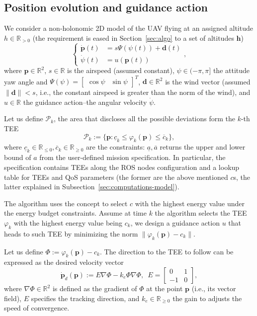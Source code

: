 \documentclass[letterpaper,10pt,conference]{ieeeconf}
\begin{document}
\subsection{Position evolution and guidance action}
\label{sec:position}

We consider a non-holonomic 2D model of the UAV flying at an assigned altitude $h\in\mathbb{R}_{>0}$ (the requirement is eased in Section~\ref{sec:algo} to a set of altitudes $\mathbf{h}$)
\begin{equation}\label{eq:uav-kinem}\begin{cases}
  \dot{\mathbf{p}}(t)&=s\Psi(\psi(t))+\mathbf{d}(t)\\
  \dot{\psi}(t)&=u(\mathbf{p}(t))
\end{cases},
\end{equation}
where $\mathbf{p}\in\mathbb{R}^2$, $s\in\mathbb{R}$ is the airspeed (assumed constant), $\psi\in(-\pi,\pi]$ the attitude yaw angle and $\Psi(\psi)=\begin{bmatrix}\cos{\psi} & \sin{\psi}\end{bmatrix}^T$, $\mathbf{d}\in\mathbb{R}^2$ is the wind vector (assumed $\|\mathbf{d}\|<s$, i.e., the constant airspeed is greater than the norm of the wind), and $u\in\mathbb{R}$ the guidance action--the angular velocity $\dot{\psi}$.

Let us define $\mathcal{P}_k$, the area that discloses all the possible deviations form the $k$-th TEE 
\begin{equation}\label{eq:area}
  \mathcal{P}_k:=\{\mathbf{p}:\underline{c}_k\leq\varphi_k(\mathbf{p})\leq\overline{c}_k\},
\end{equation}
where $\underline{c}_k\in\mathbb{R}_{\leq 0},\overline{c}_k\in\mathbb{R}_{\geq 0}$ are the constraints: $\underline{a},\overline{a}$ returns the upper and lower bound of $a$ from the user-defined mission specification. In particular, the specification contains TEEs along the ROS nodes configuration and a lookup table for TEEs and QoS parameters (the former are the above mentioned $c$s, the latter explained in Subsection~\ref{sec:computations-model}).

The algorithm uses the concept to select $c$ with the highest energy value under the energy budget constraints. Assume at time $k$ the algorithm selects the TEE $\varphi_k$ with the highest energy value being $c_k$, we design a guidance action $u$ that heads to such TEE by minimizing the norm $\|\varphi_k(\mathbf{p})-c_k\|$.

Let us define $\varPhi:=\varphi_k(\mathbf{p})-c_k$. The direction to the TEE to follow can be expressed as the desired velocity vector
\begin{equation}\label{eq:pd}
  \dot{\mathbf{p}}_d(\mathbf{p}):=E\nabla\varPhi-k_e\varPhi\nabla\varPhi,\,\,\,E=\begin{bmatrix}
    0&1\\-1&0
  \end{bmatrix},
\end{equation}
where $\nabla\varPhi\in\mathbb{R}^2$ is defined as the gradient of $\varPhi$ at the point $\mathbf{p}$ (i.e., its vector field), $E$ specifies the tracking direction, and $k_e\in\mathbb{R}_{\geq 0}$ the gain to adjusts the speed of convergence.
\end{document}
